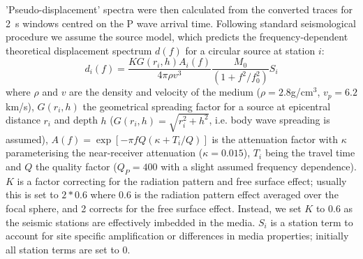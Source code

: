 \documentclass[reviewcopy]{elsarticle}
\begin{document}
'Pseudo-displacement' spectra were then calculated from the converted traces for 2~s windows
centred on the P wave arrival time.  Following standard seismological
procedure we assume the \citet{brune70} source model, which predicts
the frequency-dependent theoretical displacement spectrum $d(f)$ for a circular source at
station $i$:
\begin{equation}
d_i(f)=\frac{K G(r_i,h) A_i(f)}{4 \pi \rho v^3} \frac{M_0}{(1+f^2/f_0^2)}  S_i
\end{equation}
where $\rho$ and $v$ are the density and velocity of the medium
($\rho=2.8$g/cm$^3$, $v_p=6.2$km/s), $G(r_i,h)$ the geometrical
spreading factor for a source at epicentral distance $r_i$ and depth
$h$ ($G(r_i,h)=\sqrt{r_i^2+h^2}$, i.e. body wave spreading is assumed),
$A(f)=\exp[-\pi f Q (\kappa + T_i / Q)]$ is the attenuation factor with
$\kappa$ parameterising the near-receiver attenuation ($\kappa=0.015$),
$T_i$ being the travel time and $Q$ the quality factor ($Q_P=400$ with a
slight assumed frequency dependence). $K$ is a factor correcting for the
radiation pattern and free surface effect; usually this is set to
$2*0.6$ where 0.6 is the radiation pattern effect averaged over the
focal sphere, and 2 corrects for the free surface effect.  Instead, we
set $K$ to 0.6 as the seismic stations are effectively imbedded in the
media.  $S_i$ is a station term to account for site specific
amplification or differences in media properties; initially all
station terms are set to 0.
\end{document}
